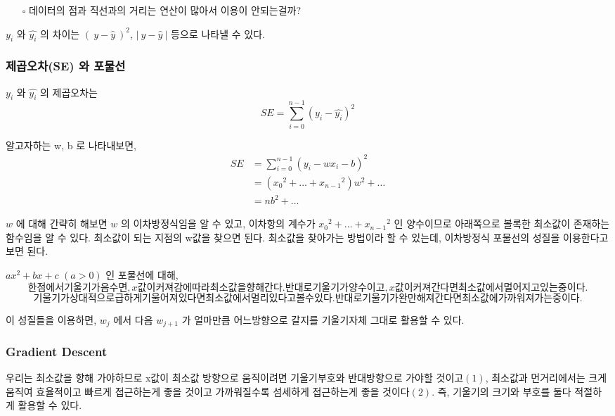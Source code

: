 \documentclass[11pt]{article}
\begin{document}
\begin{itemize}
\item[{$\square$}] 데이터의 점과 직선과의 거리는 연산이 많아서 이용이 안되는걸까?
\end{itemize}

\(y_{i}\) 와 \(\hat{y_{i}}\) 의 차이는  \((\ y-\hat{y}\ )^2\), \(\left\lvert\ y - \hat{y}\ \right\rvert\) 등으로 나타낼 수 있다.

\subsubsection{제곱오차(SE) 와 포물선}
\label{sec:org18603d0}
\(y_{i}\) 와 \(\hat{y_{i}}\) 의 제곱오차는 
\begin{equation*}
  SE = \sum_{i=0}^{n-1} (y_{i} - \hat{y_{i}})^2
\end{equation*}

알고자하는 w, b 로 나타내보면,
\begin{equation*}
\begin{split}
  SE & = \sum_{i=0}^{n-1} ({y_{i} - wx_{i} - b})^2 \\
     & = ({x_{0}}^2 + \dots + {x_{n-1}}^2)w^2 + \dots \\
     & = nb^2 + \dots
\end{split}
\end{equation*}

\(w\) 에 대해 간략히 해보면 \(w\) 의 이차방정식임을 알 수 있고, 이차항의 계수가 \({x_{0}}^2 + \dots + {x_{n-1}}^2\) 인 양수이므로 아래쪽으로 볼록한 최소값이 존재하는 함수임을 알 수 있다. 최소값이 되는 지점의 w값을 찾으면 된다. 최소값을 찾아가는 방법이라 할 수 있는데, 이차방정식 포물선의 성질을 이용한다고 보면 된다.

\(ax^2+bx+c\) \((a>0)\) 인 포물선에 대해,
\begin{equation}
한 점에서 기울기가 음수면, x 값이 커져감에 따라 최소값을 향해 간다. 반대로 기울기가 양수이고, x값이 커져간다면 최소값에서 멀어지고 있는 중이다.
\end{equation}
\begin{equation}
기울기가 상대적으로 급하게 기울어져 있다면 최소값에서 멀리있다고 볼 수 있다. 반대로 기울기가 완만해져간다면 최소값에 가까워져가는 중이다. 
\end{equation}

이 성질들을 이용하면, \(w_{j}\) 에서 다음 \(w_{j+1}\) 가 얼마만큼 어느방향으로 갈지를 기울기자체 그대로 활용할 수 있다. 

\subsubsection{Gradient Descent}
\label{sec:orgd69b2e0}
우리는 최소값을 향해 가야하므로 x값이 최소값 방향으로 움직이려면 기울기부호와 반대방향으로 가야할 것이고\((1)\), 최소값과 먼거리에서는 크게 움직여 효율적이고 빠르게 접근하는게 좋을 것이고 가까워질수록 섬세하게 접근하는게 좋을 것이다\((2)\). 즉, 기울기의 크기와 부호를 둘다 적절하게 활용할 수 있다.
\end{document}
